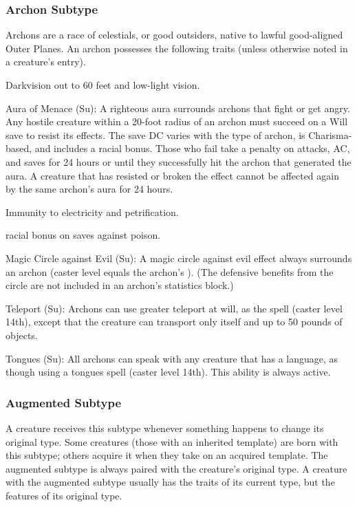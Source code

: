 {\subsubsection{Archon Subtype} Archons are a race of celestials, or good outsiders, native to lawful good-aligned Outer Planes.
 An archon possesses the following traits (unless otherwise noted in a creature's entry).
\begin{itemize*}
\item Darkvision out to 60 feet and low-light vision.
\item Aura of Menace (Su): A righteous aura surrounds archons that fight or get angry. Any hostile creature within a 20-foot radius of an archon must succeed on a Will save to resist its effects. The save DC varies with the type of archon, is Charisma-based, and includes a  racial bonus. Those who fail take a  penalty on attacks, AC, and saves for 24 hours or until they successfully hit the archon that generated the aura. A creature that has resisted or broken the effect cannot be affected again by the same archon's aura for 24 hours.
\item Immunity to electricity and petrification.
\item  {} racial bonus on saves against poison.
\item Magic Circle against Evil (Su): A magic circle against evil effect always surrounds an archon (caster level equals the archon's ). (The defensive benefits from the circle are not included in an archon's statistics block.)
\item Teleport (Su): Archons can use greater teleport at will, as the spell (caster level 14th), except that the creature can transport only itself and up to 50 pounds of objects.
\item Tongues (Su): All archons can speak with any creature that has a language, as though using a tongues spell (caster level 14th). This ability is always active.
\end{itemize*}

\subsubsection{Augmented Subtype} A creature receives this subtype whenever something happens to change its original type. Some creatures (those with an inherited template) are born with this subtype; others acquire it when they take on an acquired template. The augmented subtype is always paired with the creature's original type. A creature with the augmented subtype usually has the traits of its current type, but the features of its original type.

}
